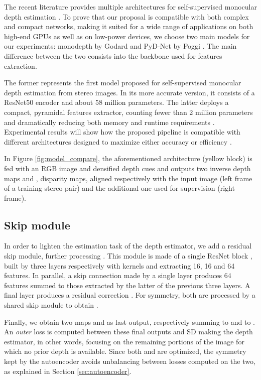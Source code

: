 \documentclass[10pt,twocolumn,letterpaper]{article}
\begin{document}
The recent literature provides multiple architectures for self-supervised monocular depth estimation \cite{Godard1,pydnet18,Tosi_2019_CVPR}.
To prove that our proposal is compatible with both complex and compact networks, making it suited for a wide range of applications on both high-end GPUs as well as on low-power devices, we choose two main models for our experiments: monodepth by Godard \etal \cite{Godard1} and PyD-Net by Poggi \etal \cite{pydnet18}. The main difference between the two consists into the backbone used for features extraction.

The former represents the first model proposed for self-supervised monocular depth estimation from stereo images. In its more accurate version, it consists of a ResNet50 \cite{He_2016_CVPR} encoder and about 58 million parameters. The latter deploys a compact, pyramidal features extractor, counting fewer than 2 million parameters and dramatically reducing both memory and runtime requirements \cite{pydnet18}. Experimental results will show how the proposed pipeline is compatible with different architectures designed to maximize either accuracy \cite{Godard1} or efficiency \cite{pydnet18}.

In Figure \ref{fig:model_compare}, the aforementioned architecture (yellow block) is fed with an RGB image and densified depth cues and outputs two inverse depth maps  and , \ie disparity maps, aligned respectively with the input image (left frame of a training stereo pair) and the additional one used for supervision (right frame). 

\subsection{Skip module}
In order to lighten the estimation task of the depth estimator, we add a residual skip module, further processing . 
This module is made of a single ResNet block \cite{He_2016_CVPR}, built by three layers respectively with kernels  and extracting 16, 16 and 64 features. In parallel, a skip connection made by a single  layer produces 64 features summed to those extracted by the latter of the previous three layers. A final  layer produces a residual correction .
For symmetry, both  are processed by a shared skip module to obtain .

Finally, we obtain two maps  and  as last output, respectively summing  to  and  to .
An \textit{outer} loss is computed between these final outputs and SD making the depth estimator, in other words, focusing on the remaining portions of the image for which no prior depth is available. 
Since both  and  are optimized, the symmetry kept by the autoencoder avoids unbalancing between losses computed on the two, as explained in Section \ref{sec:autoencoder}. 
\end{document}
